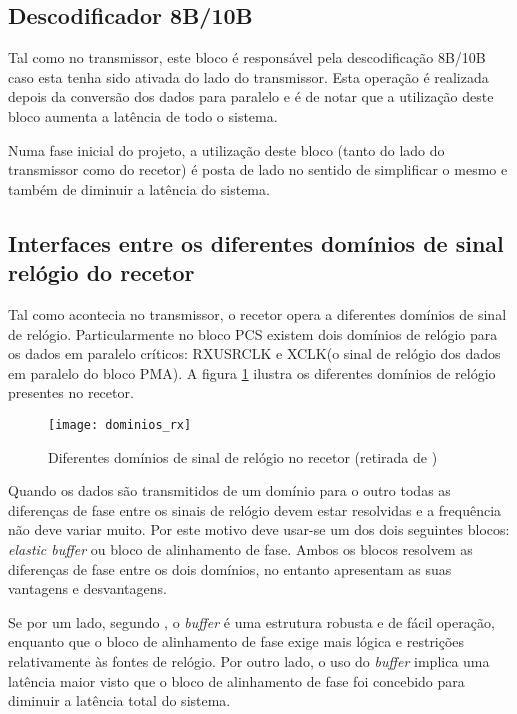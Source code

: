 \subsection{Descodificador 8B/10B}

Tal como no transmissor, este bloco é responsável pela descodificação 8B/10B caso esta tenha sido ativada do lado do transmissor. Esta operação é realizada depois da conversão dos dados para paralelo e é de notar que a utilização deste bloco aumenta a latência de todo o sistema.

Numa fase inicial do projeto, a utilização deste bloco (tanto do lado do transmissor como do recetor) é posta de lado no sentido de simplificar o mesmo e também de diminuir a latência do sistema.   

\subsection{Interfaces entre os diferentes domínios de sinal relógio do recetor} \label{subsub:rx_buffer}

Tal como acontecia no transmissor, o recetor opera a diferentes domínios de sinal de relógio. Particularmente no bloco PCS existem dois domínios de relógio para os dados em paralelo críticos: RXUSRCLK e XCLK(o sinal de relógio dos dados em paralelo do bloco PMA). A figura \ref{fig:dominios_rx} ilustra os diferentes domínios de relógio presentes no recetor.

\begin{figure}[h!]
	\begin{center}
		\leavevmode
		\texttt{[image: dominios\_rx]}
		\captionsetup{width=1.0\linewidth}
		\caption[Diferentes domínios de sinal de relógio no recetor]{Diferentes domínios de sinal de relógio no recetor (retirada de \cite{R011})}
		\label{fig:dominios_rx}
	\end{center}
\end{figure}

Quando os dados são transmitidos de um domínio para o outro todas as diferenças de fase entre os sinais de relógio devem estar resolvidas e a frequência não deve variar muito. Por este motivo deve usar-se um dos dois seguintes blocos: \textit{elastic buffer} ou bloco de alinhamento de fase. Ambos os blocos resolvem as diferenças de fase entre os dois domínios, no entanto apresentam as suas vantagens e desvantagens.

Se por um lado, segundo \cite{R011}, o \textit{buffer} é uma estrutura robusta e de fácil operação, enquanto que o bloco de alinhamento de fase exige mais lógica e restrições relativamente às fontes de relógio. Por outro lado, o uso do \textit{buffer} implica uma latência maior visto que o bloco de alinhamento de fase foi concebido para diminuir a latência total do sistema. 


